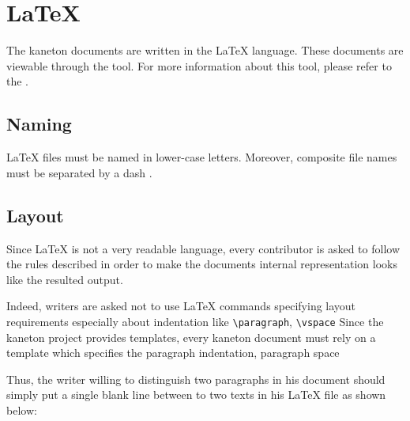 %
%
%
%
%
%

%
%

\section{\LaTeX}
\label{section:latex}

The kaneton documents are written in the {\LaTeX} language. These documents
are viewable through the  tool. For more information about
this tool, please refer to the .

%
%

\subsection{Naming}

{\LaTeX} files must be named in lower-case letters. Moreover,
composite file names must be separated by a dash \code{-}.

%
%

\subsection{Layout}

Since {\LaTeX} is not a very readable language, every contributor
is asked to follow the rules described in order to make the documents
internal representation looks like the resulted output.

Indeed, writers are asked not to use {\LaTeX} commands specifying
layout requirements especially about indentation like \verb|\paragraph|,
\verb|\vspace| \etc{} Since the kaneton project provides templates, every
kaneton document must rely on a template which specifies the paragraph
indentation, paragraph space \etc{}

Thus, the writer willing to distinguish two paragraphs in his
document should simply put a single blank line between to two texts
in his {\LaTeX} file as shown below:

